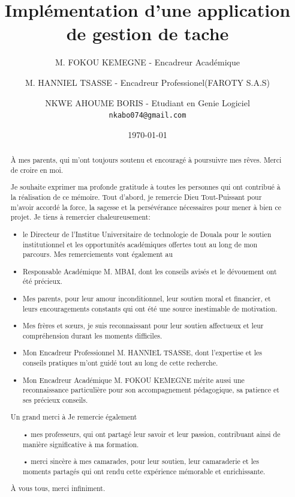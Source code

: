 \documentclass[a4paper,12pt]{report}
\title{Implémentation d'une application de gestion de tache}
\author{
  M. FOKOU KEMEGNE - Encadreur Académique\\
  \and
  M. HANNIEL TSASSE - Encadreur Professionel(FAROTY S.A.S)\\
  \and
  NKWE AHOUME BORIS - Etudiant en Genie Logiciel\\
  \texttt{nkabo074@gmail.com}
}
\date{\today}
\begin{document}
\maketitle

\def\chaptername{Chapitre}%
\def\listfigurename{Liste des figures}
\def\contentsname{Somaire}


\renewcommand{\abstractname}{Dedicace}
\begin{abstract}
À mes parents, qui m'ont toujours soutenu et encouragé à poursuivre mes rêves. Merci de croire en moi.
\end{abstract}

\renewcommand{\abstractname}{Remerciment}
\begin{abstract}
Je souhaite exprimer ma profonde gratitude à toutes les personnes qui ont contribué à la réalisation de ce mémoire. Tout d'abord, je remercie Dieu Tout-Puissant pour m'avoir accordé la force, la sagesse et la persévérance nécessaires pour mener à bien ce projet.
Je tiens à remercier chaleureusement:

\begin{itemize}
  \item le Directeur de l'Institue Universitaire de technologie de Douala pour le soutien institutionnel et les opportunités académiques offertes tout au long de mon parcours. Mes remerciements vont également au 
  \item Responsable Académique M. MBAI, dont les conseils avisés et le dévouement ont été précieux.
  \item Mes parents, pour leur amour inconditionnel, leur soutien moral et financier, et leurs encouragements constants qui ont été une source inestimable de motivation.
  \item Mes frères et sœurs, je suis reconnaissant pour leur soutien affectueux et leur compréhension durant les moments difficiles.
  \item Mon Encadreur Professionnel M. HANNIEL TSASSE, dont l'expertise et les conseils pratiques m'ont guidé tout au long de cette recherche. 
  \item Mon Encadreur Académique M. FOKOU KEMEGNE mérite aussi une reconnaissance particulière pour son accompagnement pédagogique, sa patience et ses précieux conseils.
\end{itemize}

Un grand merci à 
Je remercie également

\begin{itemize}
  \item[•] mes professeurs, qui ont partagé leur savoir et leur passion, contribuant ainsi de manière significative à ma formation.
  \item[•] merci sincère à mes camarades, pour leur soutien, leur camaraderie et les moments partagés qui ont rendu cette expérience mémorable et enrichissante.
\end{itemize}

À vous tous, merci infiniment.
\end{abstract}
\end{document}
